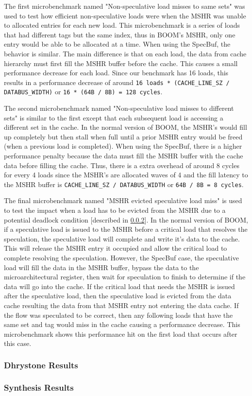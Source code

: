 The first microbenchmark named "Non-speculative load misses to same sets" was used to test how efficient non-speculative loads
were when the MSHR was unable to allocated entries for each new load. This microbenchmark is a series of loads that had different
tags but the same index, thus in BOOM's MSHR, only one entry would be able to be allocated at a time. When using the SpecBuf, the 
behavior is similar. The main difference is that on each load, the data from cache hierarchy must first fill the MSHR buffer
before the cache. This causes a small performance decrease for each load. Since our benchmark has 16 loads, this results in a performance decrease of around
{\tt 16 loads * (CACHE\_LINE\_SZ / DATABUS\_WIDTH)} or {\tt 16 * (64B / 8B) = 128 cycles}.

The second microbenchmark named "Non-speculative load misses to different sets" is similar to the first except that each subsequent
load is accessing a different set in the cache. In the normal version of BOOM, the MSHR's would fill up completely but then stall 
when full until a prior MSHR entry would be freed (when a previous load is completed). When using the SpecBuf, there is a
higher performance penalty because the data must fill the MSHR buffer with the cache data before filling the cache. Thus, there 
is a extra overhead of around 8 cycles for every 4 loads since the MSHR's are allocated waves of 4 and the fill latency to the MSHR
buffer is {\tt CACHE\_LINE\_SZ / DATABUS\_WIDTH} or {\tt 64B / 8B = 8 cycles}.

The final microbenchmark named "MSHR evicted speculative load miss" is used to test the impact when a load has to be evicted from the 
MSHR due to a potential deadlock condition [described in \ref{}]. In the normal version of BOOM, if a speculative load is issued to the 
MSHR before a critical load that resolves the speculation, the speculative load will complete and
write it's data to the cache. This will release the MSHR entry it occupied and allow the critical load to complete resolving the speculation. 
However, the SpecBuf case, the speculative load will fill the data in the MSHR buffer, bypass the data to the microarchitectural register, 
then wait for speculation to finish to determine if the data will go into the cache. If the critical load that needs the MSHR is issued after the speculative load,
then the speculative load is evicted from the data cache resulting the data from that MSHR entry not entering the data cache. If the 
flow was speculated to be correct, then any following loads that have the same set and tag would miss in the cache causing a performance decrease.
This microbenchmark shows this performance hit on the first load that occurs after this case.

\subsubsection{Dhrystone Results}

\subsubsection{Synthesis Results}

